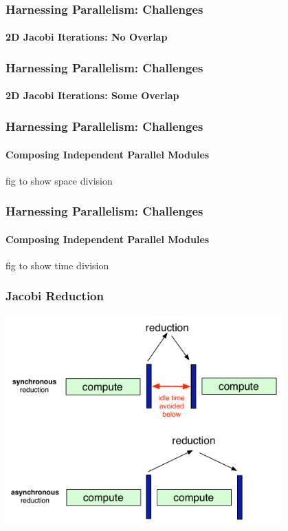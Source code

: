 \begin{frame}[fragile]
\frametitle{Harnessing Parallelism: Challenges}
\framesubtitle{2D Jacobi Iterations: No Overlap}
    
\end{frame}


\begin{frame}[fragile]
\frametitle{Harnessing Parallelism: Challenges}
\framesubtitle{2D Jacobi Iterations: Some Overlap}
    
\end{frame}


\begin{frame}[fragile]
\frametitle{Harnessing Parallelism: Challenges}
\framesubtitle{Composing Independent Parallel Modules}
    fig to show space division
\end{frame}


\begin{frame}[fragile]
\frametitle{Harnessing Parallelism: Challenges}
\framesubtitle{Composing Independent Parallel Modules}
    fig to show time division
\end{frame}

\begin{frame}
  \frametitle{Jacobi Reduction}
  \begin{center}
    \includegraphics[width=0.8\textwidth]{figures/asyncReduction.pdf}
  \end{center}
\end{frame}
